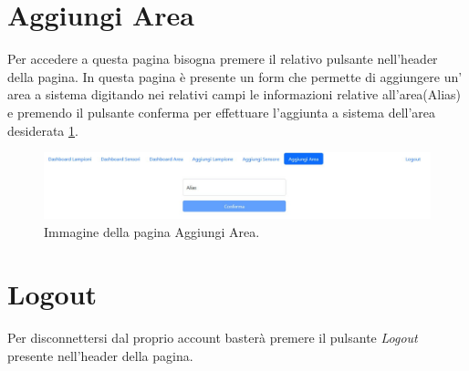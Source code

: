 \section{Aggiungi Area}

Per accedere a questa pagina bisogna premere il relativo pulsante nell'header della pagina. In questa pagina è presente un form che permette di aggiungere un' area a sistema digitando nei relativi campi le informazioni relative all'area(Alias) e premendo il pulsante conferma per effettuare l'aggiunta a sistema dell'area desiderata \ref{fig:aggiunta_area}.

\begin{figure}[ht]
    \centering
    \includegraphics[width=\textwidth]{img/aggiunta_area.jpeg}
    \caption{Immagine della pagina Aggiungi Area.}
    \label{fig:aggiunta_area}
\end{figure}

\section{Logout}

Per disconnettersi dal proprio account basterà premere il pulsante \textit{Logout} presente nell'header della pagina.